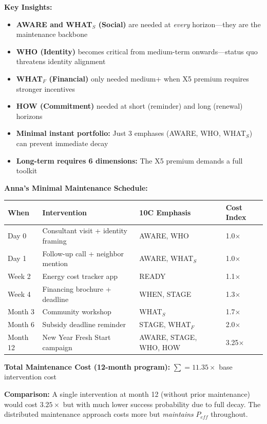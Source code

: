 \textbf{Key Insights:}
\begin{itemize}[nosep]
\item \textbf{AWARE and WHAT$_S$ (Social)} are needed at \emph{every} horizon---they are the maintenance backbone
\item \textbf{WHO (Identity)} becomes critical from medium-term onwards---status quo threatens identity alignment
\item \textbf{WHAT$_F$ (Financial)} only needed medium+ when X5 premium requires stronger incentives
\item \textbf{HOW (Commitment)} needed at short (reminder) and long (renewal) horizons
\item \textbf{Minimal instant portfolio:} Just 3 emphases (AWARE, WHO, WHAT$_S$) can prevent immediate decay
\item \textbf{Long-term requires 6 dimensions:} The X5 premium demands a full toolkit
\end{itemize}

\textbf{Anna's Minimal Maintenance Schedule:}

\begin{center}
\renewcommand{\arraystretch}{1.2}
\begin{tabular}{@{}llll@{}}
\toprule
\textbf{When} & \textbf{Intervention} & \textbf{10C Emphasis} & \textbf{Cost Index} \\
\midrule
Day 0 & Consultant visit + identity framing & AWARE, WHO & 1.0$\times$ \\
Day 1 & Follow-up call + neighbor mention & AWARE, WHAT$_S$ & 1.0$\times$ \\
Week 2 & Energy cost tracker app & READY & 1.1$\times$ \\
Week 4 & Financing brochure + deadline & WHEN, STAGE & 1.3$\times$ \\
Month 3 & Community workshop & WHAT$_S$ & 1.7$\times$ \\
Month 6 & Subsidy deadline reminder & STAGE, WHAT$_F$ & 2.0$\times$ \\
Month 12 & New Year Fresh Start campaign & AWARE, STAGE, WHO, HOW & 3.25$\times$ \\
\bottomrule
\end{tabular}
\end{center}

\textbf{Total Maintenance Cost (12-month program):} $\sum = 11.35 \times$ base intervention cost

\textbf{Comparison:} A single intervention at month 12 (without prior maintenance) would cost $3.25\times$ but with much lower success probability due to full decay. The distributed maintenance approach costs more but \emph{maintains} $P_{eff}$ throughout.

